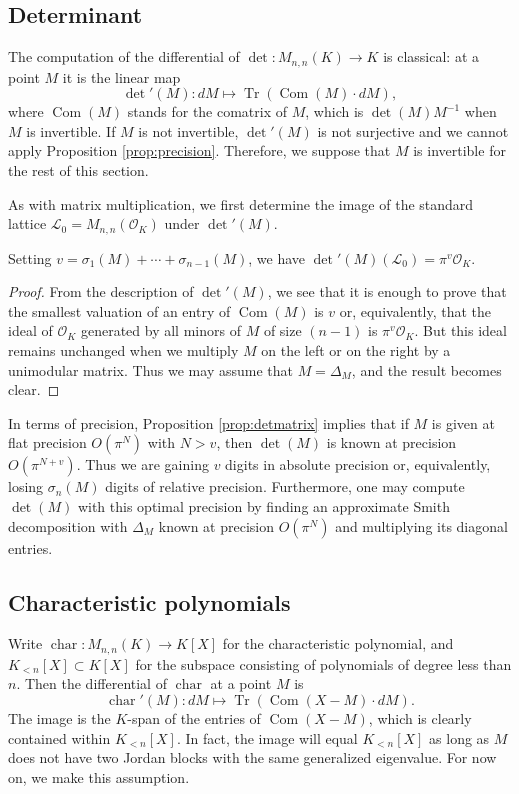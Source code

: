 \documentclass{sig-alternate}
\DeclareMathOperator{\tr}{Tr}
\DeclareMathOperator{\com}{Com}
\renewcommand{\O}{\mathcal O}
\newcommand{\detp}{\det{'}}
\DeclareMathOperator{\charpoly}{char}
\newcommand{\charp}{\charpoly'}
\begin{document}
\subsection{Determinant}
\label{ssec:det}

The computation of the differential of $\det : M_{n,n}(K) \to K$
is classical: at a point $M$ it is the linear map
\[
\detp(M) : dM \mapsto \tr(\com(M) \cdot dM),
\]
where $\com(M)$ stands for the comatrix of $M$, which is $\det(M) M^{-1}$ when $M$ is invertible. If $M$ is not 
invertible, $\detp(M)$ is not surjective and we cannot apply Proposition 
\ref{prop:precision}. Therefore, we suppose that $M$ is invertible for the rest of this section.

As with matrix multiplication, we first determine the image of
the standard lattice $\mathcal L_0 = M_{n,n}(\O_K)$ under $\detp(M)$.

\begin{prop}
\label{prop:detmatrix}
Setting $v = \sigma_1(M) + \cdots + \sigma_{n-1}(M)$, we have
$\detp(M)(\mathcal L_0) = \pi^v \O_K$.
\end{prop}

\begin{proof}
From the description of $\detp(M)$, we see that it is enough to prove 
that the smallest valuation of an entry of $\com(M)$ is $v$
or, equivalently, that the ideal of $\O_K$ generated by all 
minors of $M$ of size $(n-1)$ is $\pi^v
\O_K$. But this ideal remains unchanged when we multiply $M$ 
on the left or on the right by a unimodular matrix. Thus we may 
assume that $M = \Delta_M$, and the result becomes clear.
\end{proof}

In terms of precision, Proposition \ref{prop:detmatrix} implies that if 
$M$ is given at flat precision $O(\pi^N)$ with $N > v$, then $\det(M)$ 
is known at precision $O(\pi^{N+v})$.  Thus we are gaining $v$  
digits in absolute precision or, equivalently, losing $\sigma_n(M)$ digits
of relative precision.
Furthermore, one may compute $\det(M)$ with this optimal precision by finding an approximate
Smith decomposition with $\Delta_M$ known at precision $O(\pi^N)$ and
multiplying its diagonal entries. 

\subsection{Characteristic polynomials} \label{ssec:charpoly}

Write $\charpoly : M_{n,n}(K) \to K[X]$ for the characteristic 
polynomial, and $K_{<n}[X] \subset K[X]$ for the subspace consisting of 
polynomials of degree less than $n$.  Then the differential of 
$\charpoly$ at a point $M$ is
\[
\charp(M) : dM \mapsto \tr(\com(X - M) \cdot dM).
\]
The image is the $K$-span of the entries of $\com(X{-}M)$, which is 
clearly contained within $K_{<n}[X]$.  In fact, the image will equal 
$K_{<n}[X]$ as long as $M$ does not have two Jordan blocks with the same 
generalized eigenvalue. For now on, we make this assumption.
\end{document}
